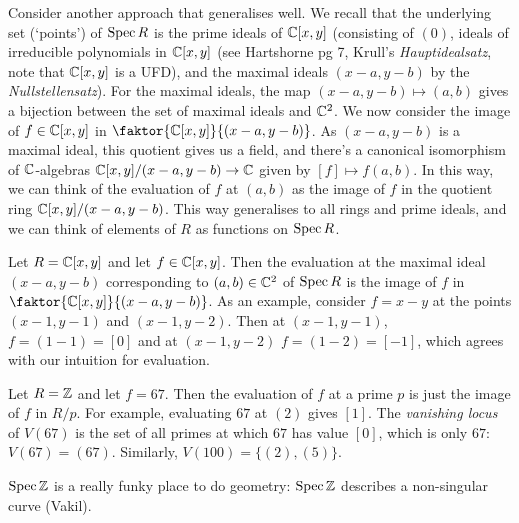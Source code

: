 Consider another approach that generalises well.
We recall that the underlying set (`points') of $\operatorname{Spec}{R}$ is the prime ideals of $\mathbb{C}[x,y]$ (consisting of $(0)$, ideals of irreducible polynomials in $\mathbb{C}[x,y]$ (see Hartshorne pg 7, Krull's \emph{Hauptidealsatz}, note that $\mathbb{C}[x,y]$ is a UFD), and the maximal ideals $(x-a,y-b)$ by the \emph{Nullstellensatz}).
For the maximal ideals, the map \((x-a,y-b) \mapsto (a,b)\) gives a bijection between the set of maximal ideals and \(\mathbb{C}^2\).
We now consider the image of $f\in\mathbb{C}[x,y]$ in $\faktor{\C[x,y]}{(x-a,y-b)}$.
As $(x-a,y-b)$ is a maximal ideal, this quotient gives us a field, and there's a canonical isomorphism of $\mathbb{C}$-algebras \(\mathbb{C}[x,y]/(x-a,y-b) \to \mathbb{C}\) given by $[f]\mapsto f(a,b)$.
In this way, we can think of the evaluation of \(f\) at \((a,b)\) as the image of \(f\) in the quotient ring \(\mathbb{C}[x,y]/(x-a,y-b)\). 
This way generalises to all rings and prime ideals, and we can think of elements of \(R\) as functions on \(\operatorname{Spec} R\).
\begin{example}
    Let $R=\mathbb{C}[x,y]$ and let $f\in\mathbb{C}[x,y]$.
    Then the evaluation at the maximal ideal $(x-a,y-b)$ corresponding to $(a,b)\in \mathbb{C}^2$ of $\operatorname{Spec}{R}$ is the image of $f$ in $\faktor{\C[x,y]}{(x-a,y-b)}$.
    As an example, consider $f=x-y$ at the points $(x-1,y-1)$ and $(x-1,y-2)$.
    Then at $(x-1,y-1)$, $f=(1-1)=[0]$ and at $(x-1,y-2)$ $f=(1-2)=[-1]$, which agrees with our intuition for evaluation.
\end{example}

\begin{example}
  Let $R=\mathbb{Z}$ and let $f=67$.
  Then the evaluation of \(f\) at a prime \(p\) is just the image of \(f\) in \(R/p\).
    For example, evaluating $67$ at $(2)$ gives $[1]$.
    The \emph{vanishing locus} of $V(67)$ is the set of all primes at which $67$ has value $[0]$, which is only $67$: $V(67)=(67)$.
    Similarly, $V(100)=\{(2),(5)\}$.
\end{example}

\begin{remark}
    $\operatorname{Spec}{\mathbb{Z}}$ is a really funky place to do geometry: $\operatorname{Spec}{\mathbb{Z}}$ describes a non-singular curve (Vakil).
  \end{remark}

